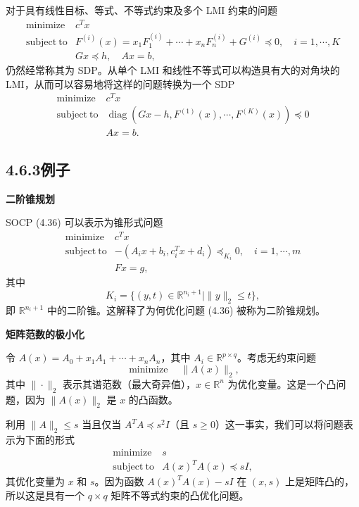 \documentclass[UTF8, 12pt, fontset=fandol, oneside]{ctexart}
\begin{document}
对于具有线性目标、等式、不等式约束及多个 LMI 约束的问题
\[
\begin{array}{ll}
\mathop{\mathrm{minimize}} & c^Tx\\
\mathrm{subject\ to} & F^{(i)}(x)=x_1F_1^{(i)}+\cdots+x_nF_n^{(i)}+G^{(i)}\preceq 0,\quad i=1,\cdots,K\\
& Gx\preceq h,\quad Ax=b,
\end{array}
\]
仍然经常称其为 SDP。从单个 LMI 和线性不等式可以构造具有大的对角块的 LMI，从而可以容易地将这样的问题转换为一个 SDP
\[
\begin{array}{ll}
\mathop{\mathrm{minimize}} & c^Tx\\
\mathrm{subject\ to} & \operatorname{diag}(Gx-h,F^{(1)}(x),\cdots,F^{(K)}(x))\preceq 0\\
& Ax=b.
\end{array}
\]

\subsection*{4.6.3\quad 例子}

\noindent\textbf{二阶锥规划}

SOCP (4.36) 可以表示为锥形式问题
\[
\begin{array}{ll}
\mathop{\mathrm{minimize}} & c^Tx\\
\mathrm{subject\ to} & -(A_ix+b_i,c_i^Tx+d_i)\preceq_{K_i}0,\quad i=1,\cdots,m\\
& Fx=g,
\end{array}
\]
其中
\[
K_i=\{(y,t)\in\mathbb{R}^{n_i+1}\mid \|y\|_2\leq t\},
\]
即 $\mathbb{R}^{n_i+1}$ 中的二阶锥。这解释了为何优化问题 (4.36) 被称为二阶锥规划。

\noindent\textbf{矩阵范数的极小化}

令 $A(x)=A_0+x_1A_1+\cdots+x_nA_n$，其中 $A_i\in\mathbb{R}^{p\times q}$。考虑无约束问题
\[
\mathop{\mathrm{minimize}}\quad \|A(x)\|_2,
\]
其中 $\|\cdot\|_2$ 表示其谱范数（最大奇异值），$x\in\mathbb{R}^n$ 为优化变量。这是一个凸问题，因为 $\|A(x)\|_2$ 是 $x$ 的凸函数。

利用 $\|A\|_2\leq s$ 当且仅当 $A^TA\preceq s^2I$（且 $s\geq 0$）这一事实，我们可以将问题表示为下面的形式
\[
\begin{array}{ll}
\mathop{\mathrm{minimize}} & s\\
\mathrm{subject\ to} & A(x)^TA(x)\preceq sI,
\end{array}
\]
其优化变量为 $x$ 和 $s$。因为函数 $A(x)^TA(x)-sI$ 在 $(x,s)$ 上是矩阵凸的，所以这是具有一个 $q\times q$ 矩阵不等式约束的凸优化问题。
\end{document}
